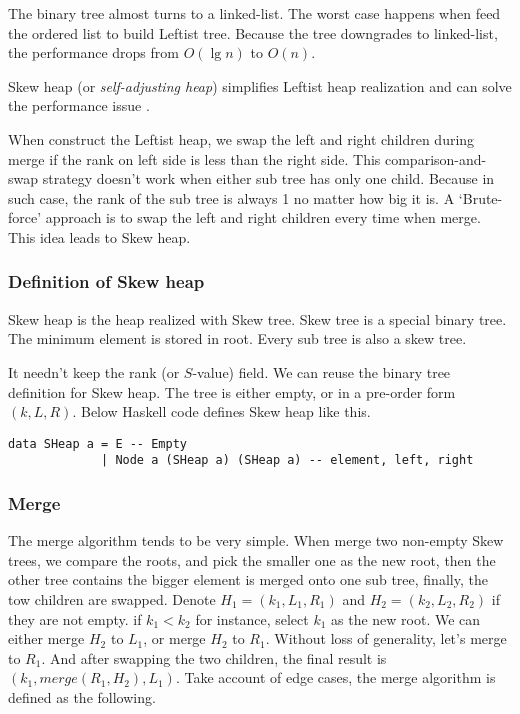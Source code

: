 \documentclass{article}
\begin{document}
The binary tree almost turns to a linked-list. The worst case
happens when feed the ordered list to build Leftist tree. Because the
tree downgrades to linked-list, the performance drops from $O(\lg n)$
to $O(n)$.

Skew heap (or {\em self-adjusting heap}) simplifies Leftist heap realization
and can solve the performance issue\cite{wiki-skew-heap} \cite{self-adjusting-heaps}.

When construct the Leftist heap, we swap the left and right children during merge
if the rank on left side is less than the right side. This comparison-and-swap strategy
doesn't work when either sub tree has only one child. Because
in such case, the rank of the sub tree is always 1 no matter how
big it is. A `Brute-force' approach is to swap the left and right children
every time when merge. This idea leads to Skew heap.

\subsubsection{Definition of Skew heap}

Skew heap is the heap realized with Skew tree. Skew tree is a special
binary tree. The minimum element is stored in root. Every sub tree is
also a skew tree.

It needn't keep the rank (or $S$-value) field. We can reuse the
binary tree definition for Skew heap. The tree is either empty,
or in a pre-order form $(k, L, R)$. Below Haskell code defines
Skew heap like this.

\lstset{language=Haskell}
\begin{lstlisting}
data SHeap a = E -- Empty
             | Node a (SHeap a) (SHeap a) -- element, left, right
\end{lstlisting}

\subsubsection{Merge}

The merge algorithm tends to be very simple.
When merge two non-empty Skew
trees, we compare the roots, and pick the smaller
one as the new root, then the other tree contains the bigger
element is merged onto one sub tree, finally,
the tow children are swapped. Denote $H_1 = (k_1, L_1, R_1)$
and $H_2 =(k_2, L_2, R_2)$ if they are not empty.
if $k_1 < k_2$ for instance, select $k_1$ as the new root. We can
either merge $H_2$ to $L_1$, or merge $H_2$ to $R_1$.
Without loss of generality, let's merge to $R_1$.
And after swapping the two children, the final result
is $(k_1, merge(R_1, H_2), L_1)$. Take account of
edge cases, the merge algorithm is defined as the
following.
\end{document}
